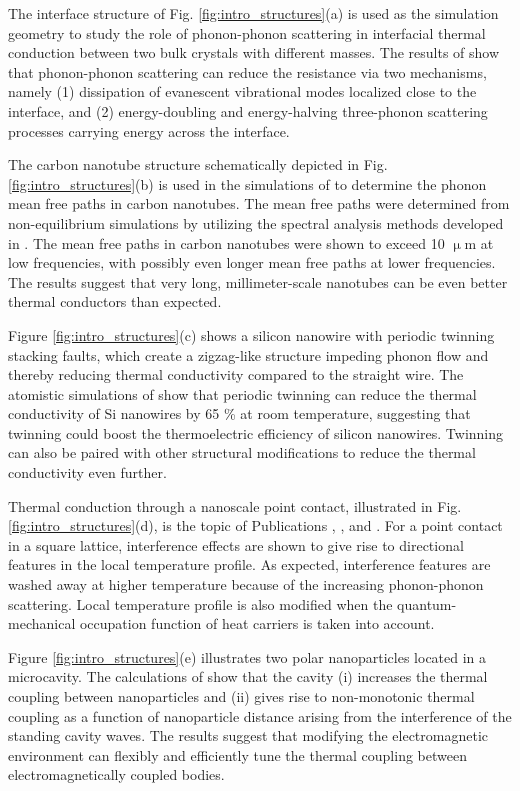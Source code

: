 The interface structure of Fig. \ref{fig:intro_structures}(a) is used as the simulation geometry to study the role of phonon-phonon scattering in interfacial thermal conduction between two bulk crystals with different masses. The results of  show that phonon-phonon scattering can reduce the resistance via two mechanisms, namely (1) dissipation of evanescent vibrational modes localized close to the interface, and (2) energy-doubling and energy-halving three-phonon scattering processes carrying energy across the interface.  

The carbon nanotube structure schematically depicted in Fig. \ref{fig:intro_structures}(b) is used in the simulations of  to determine the phonon mean free paths in carbon nanotubes. The mean free paths were determined from non-equilibrium simulations by utilizing the spectral analysis methods developed in . The mean free paths in carbon nanotubes were shown to exceed 10 $\upmu$m at low frequencies, with possibly even longer mean free paths at lower frequencies. The results suggest that very long, millimeter-scale nanotubes can be even better thermal conductors than expected. 

Figure \ref{fig:intro_structures}(c) shows a silicon nanowire with periodic twinning stacking faults, which create a zigzag-like structure impeding phonon flow and thereby reducing thermal conductivity compared to the straight wire. The atomistic simulations of  show that periodic twinning can reduce the thermal conductivity of Si nanowires by 65 \% at room temperature, suggesting that twinning could boost the thermoelectric efficiency of silicon nanowires. Twinning can also be paired with other structural modifications to reduce the thermal conductivity even further.

Thermal conduction through a nanoscale point contact, illustrated in Fig. \ref{fig:intro_structures}(d), is the topic of Publications , , and . For a point contact in a square lattice, interference effects are shown to give rise to directional features in the local temperature profile. As expected, interference features are washed away at higher temperature because of the increasing phonon-phonon scattering. Local temperature profile is also modified when the quantum-mechanical occupation function of heat carriers is taken into account. 

Figure \ref{fig:intro_structures}(e) illustrates two polar nanoparticles located in a microcavity. The calculations of  show that the cavity (i) increases the thermal coupling between nanoparticles and (ii) gives rise to non-monotonic thermal coupling as a function of nanoparticle distance arising from the interference of the standing cavity waves. The results suggest that modifying the electromagnetic environment can flexibly and efficiently tune the thermal coupling between electromagnetically coupled bodies.



